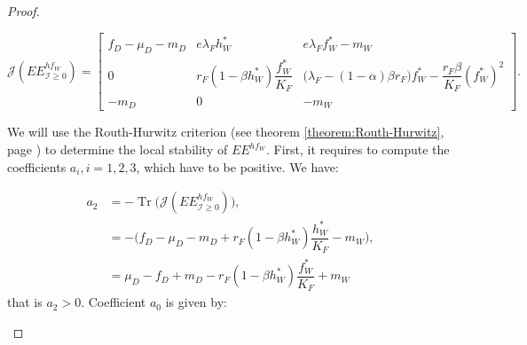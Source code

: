 \documentclass{article}
\newcommand{\lfw}{\lambda_{F}}
\newcommand{\lfw}{\lambda_{F}}
\newcommand{\cI}{\mathcal{I}}
\DeclareMathOperator{\Tr}{Tr}
\theoremstyle{definition}
\theoremstyle{remark}
\begin{document}
\begin{proof}
\begin{itemize}
\begin{equation*}
\mathcal{J}(EE^{hf_W}_{\cI \geq 0}) = \begin{bmatrix}
f_D -\mu_D - m_D & e \lfw h_W^* & e \lfw f^*_W - m_W \\
0 & r_F(1 - \beta h_W^*)\dfrac{f_W^*}{K_F} & \big( \lfw - (1-\alpha)\beta r_F\big) f_W^* -  \dfrac{r_F\beta}{K_F} (f_W^*)^2 \\
-m_D & 0 & -m_W
\end{bmatrix}.
\end{equation*} 


We will use the Routh-Hurwitz criterion (see theorem \ref{theorem:Routh-Hurwitz}, page \pageref{theorem:Routh-Hurwitz}) to determine the local stability of $EE^{hf_W}$. First, it requires to compute the coefficients $a_i, i =1,2,3$, which have to be positive.
We have:

\begin{subequations}
\begin{align}
a_2 &= - \Tr\Big(\mathcal{J}(EE^{hf_W}_{\cI \geq 0})\Big), \\
 &= -\Big(f_D - \mu_D - m_D + r_F (1 - \beta h_W^*) \dfrac{h_W^*}{K_F} - m_W\Big), \\
 &= \mu_D - f_D + m_D - r_F (1 - \beta h_W^*) \dfrac{f_W^*}{K_F} + m_W
 \label{equation:coefficient a2}
\end{align}
\end{subequations}
that is $a_2>0$. Coefficient $a_0$ is given by:


\end{itemize}
\end{proof}
\end{document}
